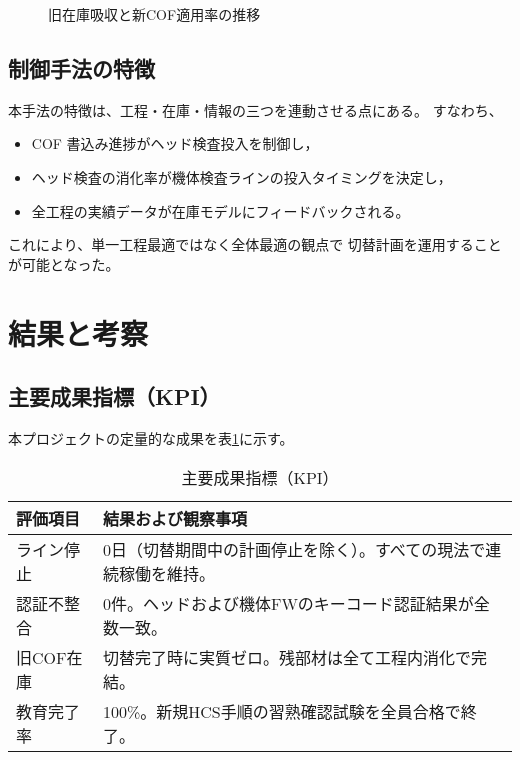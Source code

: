 \documentclass[journal,twocolumn]{IEEEtran}
\begin{document}
\begin{figure}[t]
\centering
{}
\caption{旧在庫吸収と新COF適用率の推移}
\label{fig:inventory}
\end{figure}

\subsection{制御手法の特徴}

本手法の特徴は、工程・在庫・情報の三つを連動させる点にある。
すなわち、
\begin{itemize}
  \item COF 書込み進捗がヘッド検査投入を制御し，
  \item ヘッド検査の消化率が機体検査ラインの投入タイミングを決定し，
  \item 全工程の実績データが在庫モデルにフィードバックされる。
\end{itemize}
これにより、単一工程最適ではなく全体最適の観点で
切替計画を運用することが可能となった。

\section{結果と考察}

\subsection{主要成果指標（KPI）}
本プロジェクトの定量的な成果を表\ref{tab:result}に示す。

\begin{table}[t]
\caption{主要成果指標（KPI）}
\label{tab:result}
\centering
\begin{tabularx}{\columnwidth}{@{}l X@{}}
\toprule
評価項目 & 結果および観察事項 \\
\midrule
ライン停止 & 0日（切替期間中の計画停止を除く）。すべての現法で連続稼働を維持。 \\[2pt]
認証不整合 & 0件。ヘッドおよび機体FWのキーコード認証結果が全数一致。 \\[2pt]
旧COF在庫 & 切替完了時に実質ゼロ。残部材は全て工程内消化で完結。 \\[2pt]
教育完了率 & 100\%。新規HCS手順の習熟確認試験を全員合格で終了。 \\
\bottomrule
\end{tabularx}
\end{table}
\end{document}
